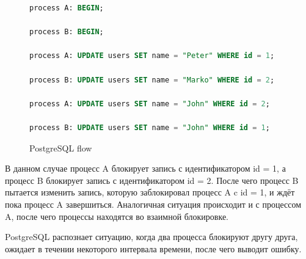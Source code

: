\begin{figure}[h]
\begin{lstlisting}[language=SQL]
process A: BEGIN;

process B: BEGIN;

process A: UPDATE users SET name = "Peter" WHERE id = 1;

process B: UPDATE users SET name = "Marko" WHERE id = 2;

process A: UPDATE users SET name = "John" WHERE id = 2;

process B: UPDATE users SET name = "John" WHERE id = 1;
\end{lstlisting}
\caption{PostgreSQL flow} 
\label{fig:postgre-flow}
\end{figure}

В данном случае процесс A блокирует запись с идентификатором id = 1, а процесс B блокирует запись с идентификатором id = 2. После чего процесс B пытается изменить запись, которую заблокировал процесс A c id = 1, и ждёт пока процесс A завершиться. Аналогичная ситуация происходит и с процессом A, после чего процессы находятся во взаимной блокировке.

PostgreSQL распознает ситуацию, когда два процесса блокируют другу друга, ожидает в течении некоторого интервала времени, после чего выводит ошибку.

\clearpage